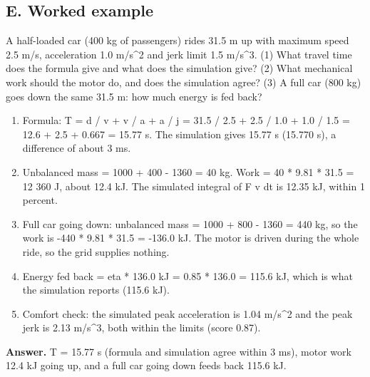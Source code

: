 \documentclass[11pt,a4paper]{article}
\begin{document}
\subsection*{E. Worked example}
A half-loaded car (400 kg of passengers) rides 31.5 m up with maximum speed 2.5 m/s, acceleration 1.0 m/s\textasciicircum{}2 and jerk limit 1.5 m/s\textasciicircum{}3. (1) What travel time does the formula give and what does the simulation give? (2) What mechanical work should the motor do, and does the simulation agree? (3) A full car (800 kg) goes down the same 31.5 m: how much energy is fed back?
\begin{enumerate}[nosep]
\item Formula: T = d / v + v / a + a / j = 31.5 / 2.5 + 2.5 / 1.0 + 1.0 / 1.5 = 12.6 + 2.5 + 0.667 = 15.77 s. The simulation gives 15.77 s (15.770 s), a difference of about 3 ms.
\item Unbalanced mass = 1000 + 400 - 1360 = 40 kg. Work = 40 * 9.81 * 31.5 = 12 360 J, about 12.4 kJ. The simulated integral of F v dt is 12.35 kJ, within 1 percent.
\item Full car going down: unbalanced mass = 1000 + 800 - 1360 = 440 kg, so the work is -440 * 9.81 * 31.5 = -136.0 kJ. The motor is driven during the whole ride, so the grid supplies nothing.
\item Energy fed back = eta * 136.0 kJ = 0.85 * 136.0 = 115.6 kJ, which is what the simulation reports (115.6 kJ).
\item Comfort check: the simulated peak acceleration is 1.04 m/s\textasciicircum{}2 and the peak jerk is 2.13 m/s\textasciicircum{}3, both within the limits (score 0.87).
\end{enumerate}
\textbf{Answer.} T = 15.77 s (formula and simulation agree within 3 ms), motor work 12.4 kJ going up, and a full car going down feeds back 115.6 kJ.
\end{document}
